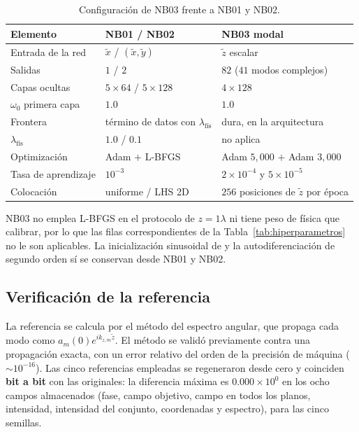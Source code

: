 \begin{table}[htbp]
\centering
\begin{threeparttable}
\caption{Configuración de NB03 frente a NB01 y NB02.}
\label{tab:nb03_config}
\begin{tabular}{lll}
\toprule
Elemento & NB01 / NB02 & NB03 modal \\
\midrule
Entrada de la red      & $\tilde x$ / $(\tilde x,\tilde y)$ & $\tilde z$ escalar \\
Salidas                & $1$ / $2$ & $82$ ($41$ modos complejos) \\
Capas ocultas          & $5\times64$ / $5\times128$ & $4\times128$ \\
$\omega_0$ primera capa& $1.0$ & $1.0$ \\
Frontera               & término de datos con $\lambda_\text{fís}$ & dura, en la arquitectura \\
$\lambda_\text{fís}$   & $1.0$ / $0.1$ & no aplica \\
Optimización           & Adam $+$ L-BFGS & Adam $5{,}000$ $+$ Adam $3{,}000$ \\
Tasa de aprendizaje    & $10^{-3}$ & $2\times10^{-4}$ y $5\times10^{-5}$ \\
Colocación             & uniforme / LHS 2D & $256$ posiciones de $\tilde z$ por época \\
\bottomrule
\end{tabular}
\begin{tablenotes}\small
    \item NB03 no emplea L-BFGS en el protocolo de $z=1\lambda$ ni tiene
    peso de física que calibrar, por lo que las filas correspondientes de la
    Tabla~\ref{tab:hiperparametros} no le son aplicables. La inicialización
    sinusoidal de \textcite{sitzmann2020siren} y la autodiferenciación de
    segundo orden sí se conservan desde NB01 y NB02.
\end{tablenotes}
\end{threeparttable}
\end{table}

\subsection{Verificación de la referencia}
\label{sec:nb03_referencia}

La referencia se calcula por el método del espectro angular, que propaga cada
modo como $a_m(0)e^{i k_{z,m}\tilde z}$. El método se validó previamente contra
una propagación exacta, con un error relativo del orden de la precisión de
máquina ($\sim10^{-16}$). Las cinco
referencias empleadas se regeneraron desde cero y coinciden \textbf{bit a bit}
con las originales: la diferencia máxima es $0.000\times10^{0}$ en los ocho
campos almacenados (fase, campo objetivo, campo en todos los planos, intensidad,
intensidad del conjunto, coordenadas y espectro), para las cinco semillas.

